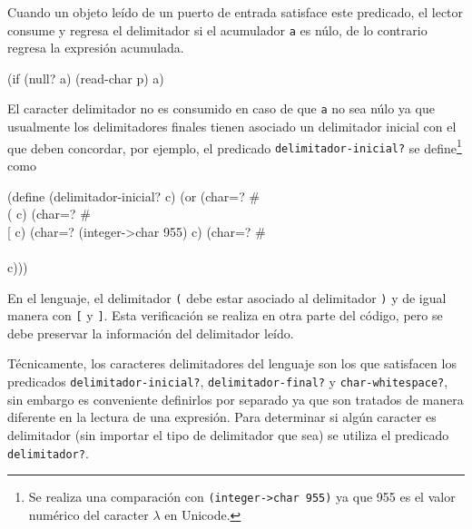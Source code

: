 \documentclass[letterpaper,twoside,openright,11pt]{book}
\begin{document}
Cuando un objeto leído de un puerto de entrada satisface este predicado, el lector consume y regresa el delimitador si el acumulador {\tt{}a} es núlo, de lo contrario regresa la expresión acumulada.

\nwenddocs{}\endmoddef
(if (null? a) (read-char p) a)
\nwendcode{}\nwdocspar

El caracter delimitador no es consumido en caso de que {\tt{}a} no sea núlo ya que usualmente los delimitadores finales tienen asociado un delimitador inicial con el que deben concordar, por ejemplo, el predicado {\tt{}\protect{}delimitador-inicial?} se define\footnote{Se realiza una comparación con {\tt{}(integer->char\ 955)} ya que 955 es el valor numérico del caracter \( λ \) en Unicode.} como

\nwenddocs{}\plusendmoddef
(define (delimitador-inicial? c)
  (or (char=? #\\( c)
      (char=? #\\[ c)
      (char=? (integer->char 955) c)
      (char=? #\\\\ c)))

\eatline
{}\nwendcode{}\nwdocspar

En el lenguaje, el delimitador {\tt{}{}{}(} debe estar asociado al delimitador {\tt{}{}{})} y de igual manera con {\tt{}{}{}[} y {\tt{}{}{}]}. Esta verificación se realiza en otra parte del código, pero se debe preservar la información del delimitador leído.

Técnicamente, los caracteres delimitadores del lenguaje son los que satisfacen los predicados {\tt{}\protect{}delimitador-inicial?}, {\tt{}\protect{}delimitador-final?} y {\tt{}char-whitespace?}, sin embargo es conveniente definirlos por separado ya que son tratados de manera diferente en la lectura de una expresión. Para determinar si algún caracter es delimitador (sin importar el tipo de delimitador que sea) se utiliza el predicado {\tt{}\protect{}delimitador?}.
\end{document}

